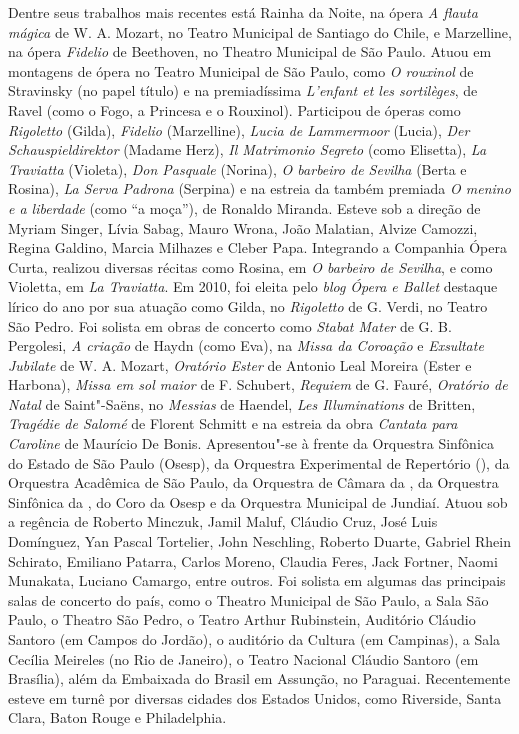 Dentre seus trabalhos mais recentes está Rainha da Noite, na ópera
\emph{A flauta mágica} de W. A. Mozart, no Teatro Municipal de Santiago
do Chile, e Marzelline, na ópera \emph{Fidelio} de Beethoven, no Theatro
Municipal de São Paulo. Atuou em montagens de ópera no Teatro Municipal
de São Paulo, como \emph{O rouxinol} de Stravinsky (no papel título) e
na premiadíssima \emph{L'enfant et les sortilèges}, de Ravel (como o
Fogo, a Princesa e o Rouxinol). Participou de óperas como
\emph{Rigoletto} (Gilda), \emph{Fidelio} (Marzelline), \emph{Lucia de
Lammermoor} (Lucia), \emph{Der Schauspieldirektor} (Madame Herz),
\emph{Il Matrimonio Segreto} (como Elisetta), \emph{La Traviatta}
(Violeta), \emph{Don Pasquale} (Norina), \emph{O barbeiro de Sevilha}
(Berta e Rosina), \emph{La Serva Padrona} (Serpina) e na estreia da
também premiada \emph{O menino e a liberdade} (como ``a moça''), de
Ronaldo Miranda. Esteve sob a direção de Myriam Singer, Lívia Sabag,
Mauro Wrona, João Malatian, Alvize Camozzi, Regina Galdino, Marcia
Milhazes e Cleber Papa. Integrando a Companhia Ópera Curta, realizou
diversas récitas como Rosina, em \emph{O barbeiro de Sevilha}, e como
Violetta, em \emph{La Traviatta}. Em 2010, foi eleita pelo \emph{blog
Ópera e Ballet} destaque lírico do ano por sua atuação como Gilda, no
\emph{Rigoletto} de G. Verdi, no Teatro São Pedro. Foi solista em obras
de concerto como \emph{Stabat Mater} de G. B. Pergolesi, \emph{A
criação} de Haydn (como Eva), na \emph{Missa da Coroação} e
\emph{Exsultate Jubilate} de W. A. Mozart, \emph{Oratório Ester} de
Antonio Leal Moreira (Ester e Harbona), \emph{Missa em sol maior} de F.
Schubert, \emph{Requiem} de G. Fauré, \emph{Oratório de Natal} de
Saint"-Saëns, no \emph{Messias} de Haendel, \emph{Les Illuminations} de
Britten, \emph{Tragédie de Salomé} de Florent Schmitt e na estreia da
obra \emph{Cantata para Caroline} de Maurício De Bonis. Apresentou"-se à
frente da Orquestra Sinfônica do Estado de São Paulo (Osesp), da
Orquestra Experimental de Repertório (), da Orquestra Acadêmica de
São Paulo, da Orquestra de Câmara da , da Orquestra Sinfônica da ,
do Coro da Osesp e da Orquestra Municipal de Jundiaí. Atuou sob a
regência de Roberto Minczuk, Jamil Maluf, Cláudio Cruz, José Luis
Domínguez, Yan Pascal Tortelier, John Neschling, Roberto Duarte, Gabriel
Rhein Schirato, Emiliano Patarra, Carlos Moreno, Claudia Feres, Jack
Fortner, Naomi Munakata, Luciano Camargo, entre outros. Foi solista em
algumas das principais salas de concerto do país, como o Theatro
Municipal de São Paulo, a Sala São Paulo, o Theatro São Pedro, o Teatro
Arthur Rubinstein, Auditório Cláudio Santoro (em Campos do Jordão), o
auditório da  Cultura (em Campinas), a Sala Cecília Meireles (no Rio
de Janeiro), o Teatro Nacional Cláudio Santoro (em Brasília), além da
Embaixada do Brasil em Assunção, no Paraguai. Recentemente esteve em
turnê por diversas cidades dos Estados Unidos, como Riverside, Santa
Clara, Baton Rouge e Philadelphia.

